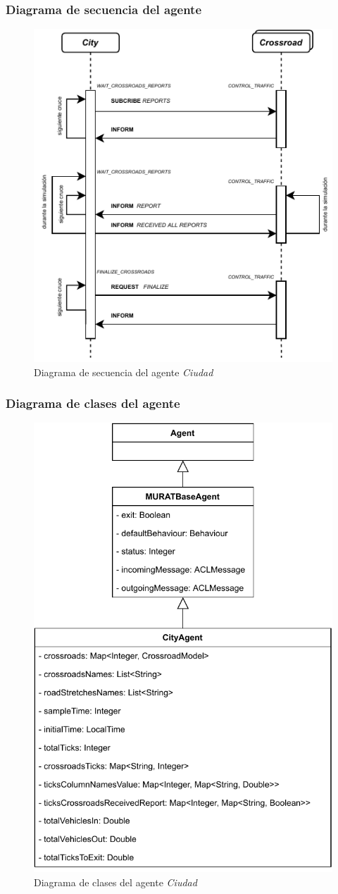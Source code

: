 \subsubsection{Diagrama de secuencia del agente}
\begin{figure}[H]
    \centering
    \includegraphics[width=0.85\linewidth]{text/image/DAgen-DS-City.pdf}
    \caption{Diagrama de secuencia del agente \textit{Ciudad}}
    \label{fig:ds_agente_ciudad}
\end{figure}

\newpage
\subsubsection{Diagrama de clases del agente}
\begin{figure}[H]
    \centering
    \includegraphics[width=0.60\linewidth]{text/image/DAgen-DC-City.pdf}
    \caption{Diagrama de clases del agente \textit{Ciudad}}
    \label{fig:dc_agente_ciudad}
\end{figure}

